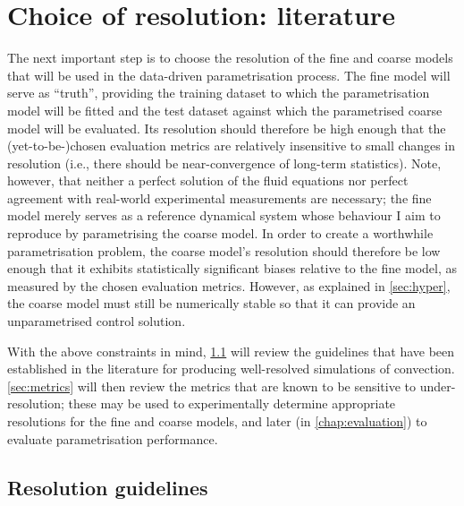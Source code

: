 \documentclass[../main.tex]{subfiles}
\begin{document}
\section{Choice of resolution: literature} \label{sec:resolution} The next
important step is to choose the resolution of the fine and coarse models that
will be used in the data-driven parametrisation process. The fine model will
serve as ``truth'', providing the training dataset to which the parametrisation
model will be fitted and the test dataset against which the parametrised coarse
model will be evaluated. Its resolution should therefore be high enough that
the (yet-to-be-)chosen evaluation metrics are relatively insensitive to small
changes in resolution (i.e., there should be near-convergence of long-term
statistics). Note, however, that neither a perfect solution of the fluid
equations nor perfect agreement with real-world experimental measurements are
necessary; the fine model merely serves as a reference dynamical system whose
behaviour I aim to reproduce by parametrising the coarse model. In order to
create a worthwhile parametrisation problem, the coarse model's resolution
should therefore be low enough that it exhibits statistically significant
biases relative to the fine model, as measured by the chosen evaluation
metrics. However, as explained in \cref{sec:hyper}, the coarse model must still
be numerically stable so that it can provide an unparametrised control
solution.

With the above constraints in mind, \cref{sec:res_requirements} will review the
guidelines that have been established in the literature for producing
well-resolved simulations of \rb{} convection. \cref{sec:metrics} will
then review the metrics that are known to be sensitive to under-resolution;
these may be used to experimentally determine appropriate resolutions for the
fine and coarse models, and later (in \cref{chap:evaluation}) to evaluate
parametrisation performance.


\subsection{Resolution guidelines}
\label{sec:res_requirements}
\end{document}
